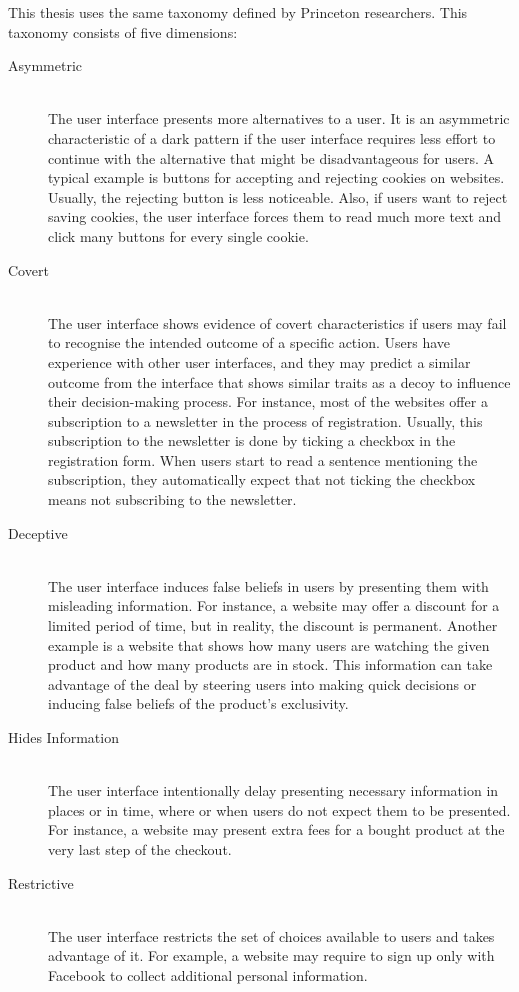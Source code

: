 This thesis uses the same taxonomy defined by Princeton researchers. This taxonomy consists of five dimensions:

\begin{description}
    \item[Asymmetric] \hfill \\ The user interface presents more alternatives to a user. It is an asymmetric characteristic of a dark pattern if the user interface requires less effort to continue with the alternative that might be disadvantageous for users. A typical example is buttons for accepting and rejecting cookies on websites. Usually, the rejecting button is less noticeable. Also, if users want to reject saving cookies, the user interface forces them to read much more text and click many buttons for every single cookie.
    \item[Covert] \hfill \\ The user interface shows evidence of covert characteristics if users may fail to recognise the intended outcome of a specific action. Users have experience with other user interfaces, and they may predict a similar outcome from the interface that shows similar traits as a decoy to influence their decision-making process. For instance, most of the websites offer a subscription to a newsletter in the process of registration. Usually, this subscription to the newsletter is done by ticking a checkbox in the registration form. When users start to read a sentence mentioning the subscription, they automatically expect that not ticking the checkbox means not subscribing to the newsletter.
    \item[Deceptive] \hfill \\ The user interface induces false beliefs in users by presenting them with misleading information. For instance, a website may offer a discount for a limited period of time, but in reality, the discount is permanent. Another example is a website that shows how many users are watching the given product and how many products are in stock. This information can take advantage of the deal by steering users into making quick decisions or inducing false beliefs of the product's exclusivity.
    \item[Hides Information] \hfill \\ The user interface intentionally delay presenting necessary information in places or in time, where or when users do not expect them to be presented. For instance, a website may present extra fees for a bought product at the very last step of the checkout.
    \item[Restrictive] \hfill \\ The user interface restricts the set of choices available to users and takes advantage of it. For example, a website may require to sign up only with Facebook to collect additional personal information.
\end{description}

